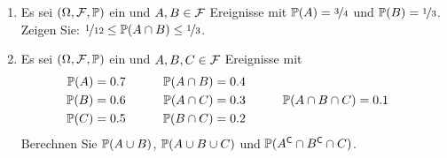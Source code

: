 \begin{exercisePage}
    \begin{exercise}
        \begin{enumerate}[leftmargin=*, label=(\alph*)]
            \item Es sei $(\Omega , \ereignisF , \P)$ ein \WRaum und $A,B \in \ereignisF$ Ereignisse mit $\P(A) = \lfrac{3}{4}$ und $\P(B) = \lfrac{1}{3}$. Zeigen Sie: $\lfrac{1}{12} \leq \P(A \cap B) \leq \lfrac{1}{3}$.
        \item Es sei $(\Omega , \ereignisF , \P)$ ein \WRaum und $A,B,C \in \ereignisF$ Ereignisse mit
        \begin{equation*}
            \begin{aligned}
                \P(A) &= 0.7 \qquad & \P(A \cap B) &= 0.4  \\
                \P(B) &= 0.6 & \P(A \cap C) &= 0.3 \qquad & \P(A \cap B \cap C) &= 0.1 \\
                \P(C) &= 0.5 & \P(B \cap C) &= 0.2 \\
            \end{aligned}
        \end{equation*}
        Berechnen Sie $\P(A \cup B)$, $\P(A \cup B \cup C)$ und $\P(A^\complement \cap B^\complement \cap C)$.
        \end{enumerate}
    \end{exercise}
    

\end{exercisePage}
